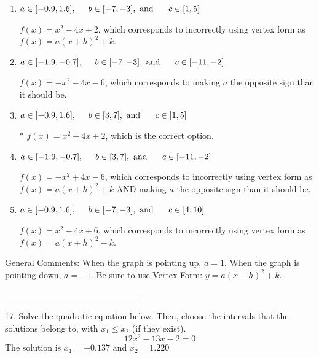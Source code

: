 \documentclass{article}[14pt]
\begin{document}
\begin{enumerate}[label=\Alph*.] 
\item $ a \in [-0.9, 1.6], \hspace*{5mm} b \in [-7, -3], \text{ and } \hspace*{5mm} c \in [1, 5] $ 

 $f(x)=x^{2} -4 x + 2$, which corresponds to incorrectly using vertex form as $f(x) = a(x+h)^2+k$. 
\item $ a \in [-1.9, -0.7], \hspace*{5mm} b \in [-7, -3], \text{ and } \hspace*{5mm} c \in [-11, -2] $ 

 $f(x)=-x^{2} -4 x -6$, which corresponds to making $a$ the opposite sign than it should be. 
\item $ a \in [-0.9, 1.6], \hspace*{5mm} b \in [3, 7], \text{ and } \hspace*{5mm} c \in [1, 5] $ 

 * $f(x)=x^{2} +4 x + 2$, which is the correct option. 
\item $ a \in [-1.9, -0.7], \hspace*{5mm} b \in [3, 7], \text{ and } \hspace*{5mm} c \in [-11, -2] $ 

 $f(x)=-x^{2} +4 x -6$, which corresponds to incorrectly using vertex form as $f(x) = a(x+h)^2+k$ AND making $a$ the opposite sign than it should be. 
\item $ a \in [-0.9, 1.6], \hspace*{5mm} b \in [-7, -3], \text{ and } \hspace*{5mm} c \in [4, 10] $ 

 $f(x)=x^{2} -4 x + 6$, which corresponds to incorrectly using vertex form as $f(x) = a(x+h)^2 - k$. 
\end{enumerate} 
 
General Comments: When the graph is pointing up, $a=1$. When the graph is pointing down, $a=-1$. Be sure to use Vertex Form: $y = a(x-h)^2+k$.

-----------------------------------------------

17. Solve the quadratic equation below. Then, choose the intervals that the solutions belong to, with $x_1 \leq x_2$ (if they exist).
$$ 12x^{2} -13 x -2 = 0 $$ 
The solution is $ x_1 = -0.137 \text{ and } x_2 = 1.220 $ 
\end{document}
